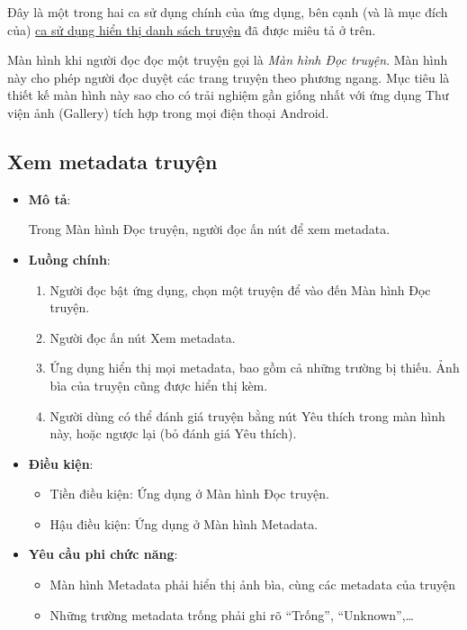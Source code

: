 \documentclass[../../thesis]{subfiles}
\begin{document}
Đây là một trong hai ca sử dụng chính của ứng dụng, bên cạnh (và là mục đích
của) \hyperref[sec:show-library]{ca sử dụng hiển thị danh sách truyện} đã được
miêu tả ở trên.

Màn hình khi người đọc đọc một truyện gọi là \emph{Màn hình Đọc truyện}. Màn
hình này cho phép người đọc duyệt các trang truyện theo phương ngang. Mục tiêu
là thiết kế màn hình này sao cho có trải nghiệm gần giống nhất với ứng dụng Thư
viện ảnh (Gallery) tích hợp trong mọi điện thoại Android.

\subsection{Xem metadata truyện}\label{sec:view-metadata}

\begin{itemize}
    \item
        \textbf{Mô tả}:

        Trong Màn hình Đọc truyện, người đọc ấn nút để xem metadata.
    \item
        \textbf{Luồng chính}:

        \begin{enumerate}
            \item
                Người đọc bật ứng dụng, chọn một truyện để vào đến Màn hình Đọc
                truyện.
            \item
                Người đọc ấn nút Xem metadata.
            \item
                Ứng dụng hiển thị mọi metadata, bao gồm cả những trường bị
                thiếu. Ảnh bìa của truyện cũng được hiển thị kèm.
            \item
                Người dùng có thể đánh giá truyện bằng nút Yêu thích trong màn
                hình này, hoặc ngược lại (bỏ đánh giá Yêu thích).
        \end{enumerate}
    \item
        \textbf{Điều kiện}:

        \begin{itemize}
            \item
                Tiền điều kiện: Ứng dụng ở Màn hình Đọc truyện.
            \item
                Hậu điều kiện: Ứng dụng ở Màn hình Metadata.
        \end{itemize}
    \item
        \textbf{Yêu cầu phi chức năng}:

        \begin{itemize}
            \item
                Màn hình Metadata phải hiển thị ảnh bìa, cùng các metadata của
                truyện
            \item
                Những trường metadata trống phải ghi rõ ``Trống'',
                ``Unknown'',\ldots{}
        \end{itemize}
  \end{itemize}
\end{document}
